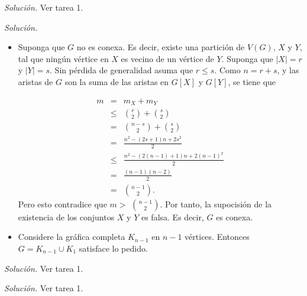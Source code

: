 \documentclass[12pt]{article}
\newenvironment{problem}[2][Problema]{\begin{trivlist}
\item[\hskip \labelsep {\bfseries #1}\hskip \labelsep {\bfseries #2}]}{\end{trivlist}}
\begin{document}
\begin{problem}{1.1.11}
\end{problem}
\textit{Solución.} Ver tarea 1.


\begin{problem}{1.1.12}
\end{problem}
\textit{Solución.}\begin{itemize}
    \item[a)] Suponga que $G$ no es conexa. Es decir, existe una partición de $V(G)$, $X$ y $Y$, tal que ningún vértice en $X$ es vecino de un vértice de $Y.$ Suponga que $\lvert X \rvert = r$ y $\lvert Y \rvert = s$. Sin pérdida de generalidad asuma que $r \leq s.$ Como $n = r + s$, y las aristas de $G$ son la suma de las aristas en $G[X]$ y $G[Y]$, se tiene que

\begin{eqnarray*}
m &=& m_X + m_Y \\
&\leq& {r \choose 2} + {s \choose 2} \\
&=& {n-s \choose 2} + {s \choose 2} \\
&=& \frac{n^2 - (2s + 1)n + 2s^2}{2}\\
&\leq& \frac{n^2 - (2 (n-1) + 1)n + 2(n-1)^2}{2}\\
&=& \frac{(n-1)(n-2)}{2} \\
&=& {n-1 \choose 2}.
\end{eqnarray*}
Pero esto contradice que $m >$ ${ n-1 \choose 2 }$. Por tanto, la supocisión de la existencia de los conjuntos $X$ y $Y$ es falsa. Es decir, $G$ es conexa.

\item[b)] Considere la gráfica completa $K_{n-1}$ en $n-1$ vértices. Entonces $G = K_{n-1} \cup K_1$ satisface lo pedido.
\end{itemize} 

\begin{problem}{1.1.13}
\end{problem}
\textit{Solución.} Ver tarea 1.


\begin{problem}{1.1.17}
\end{problem}
\textit{Solución.} Ver tarea 1.
\end{document}
